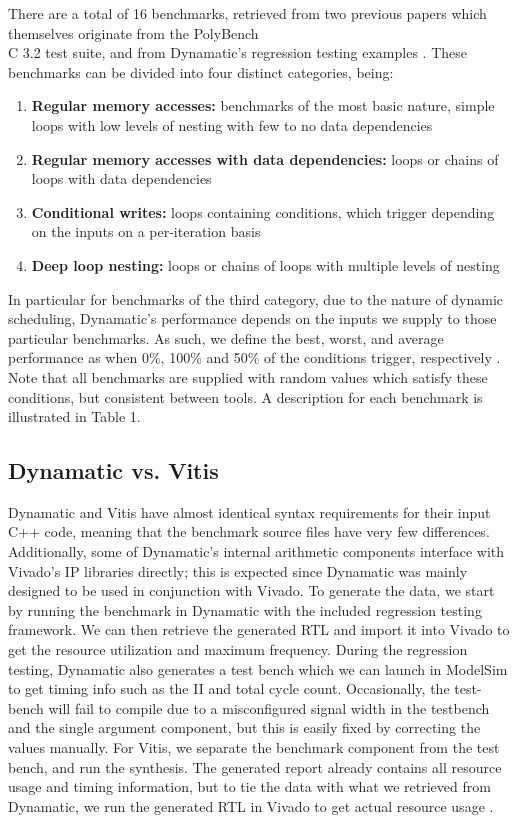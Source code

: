 \documentclass[final,5p,times,twocolumn]{elsarticle}
\begin{document}
\begin{spacing}{1.125}
There are a total of 16 benchmarks, retrieved from two previous papers which themselves originate from the PolyBench\\C 3.2 test suite, and from Dynamatic's regression testing examples \cite{dyn_repository}\cite{unleash}\cite{sttq}\cite{polybench}. These benchmarks can be divided into four distinct categories, being:
\begin{enumerate}[1.]
\item \textbf{Regular memory accesses:} benchmarks of the most basic nature, simple loops with low levels of nesting with few to no data dependencies
\item \textbf{Regular memory accesses with data dependencies:} loops or chains of loops with data dependencies
\item \textbf{Conditional writes:} loops containing conditions, which trigger depending on the inputs on a per-iteration basis
\item \textbf{Deep loop nesting:} loops or chains of loops with multiple levels of nesting
\end{enumerate}

In particular for benchmarks of the third category, due to the nature of dynamic scheduling, Dynamatic's performance depends on the inputs we supply to those particular benchmarks. As such, we define the best, worst, and average performance as when 0\%, 100\% and 50\% of the conditions trigger, respectively \cite{dataflow_circs}. Note that all benchmarks are supplied with random values which satisfy these conditions, but consistent between tools. A description for each benchmark is illustrated in Table 1.

\subsection{Dynamatic vs. Vitis}

Dynamatic and Vitis have almost identical syntax requirements for their input C++ code, meaning that the benchmark source files have very few differences. Additionally, some of Dynamatic's internal arithmetic components interface with Vivado's IP libraries directly; this is expected since Dynamatic was mainly designed to be used in conjunction with Vivado. To generate the data, we start by running the benchmark in Dynamatic with the included regression testing framework. We can then retrieve the generated RTL and import it into Vivado to get the resource utilization and maximum frequency. During the regression testing, Dynamatic also generates a test bench which we can launch in ModelSim to get timing info such as the II and total cycle count. Occasionally, the test-bench will fail to compile due to a misconfigured signal width in the testbench and the single argument component, but this is easily fixed by correcting the values manually. For Vitis, we separate the benchmark component from the test bench, and run the synthesis. The generated report already contains all resource usage and timing information, but to tie the data with what we retrieved from Dynamatic, we run the generated RTL in Vivado to get actual resource usage \cite{dyn_tut}\cite{vivado}\cite{modelsim}.


\end{spacing}
\end{document}
